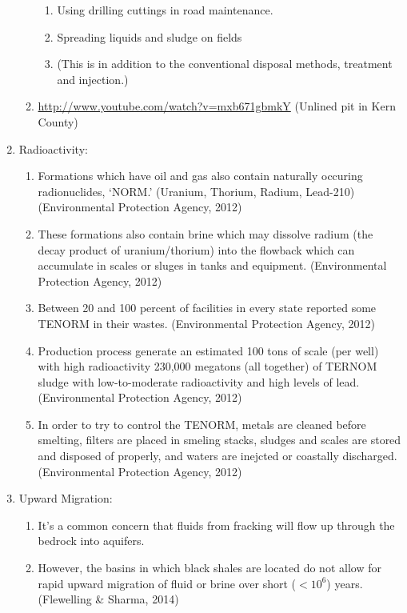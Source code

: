 \documentclass{article}
\begin{document}
\begin{enumerate}
\begin{enumerate}
\begin{enumerate}
                \item Using drilling cuttings in road maintenance.
                \item Spreading liquids and sludge on fields
                \item (This is in addition to the conventional disposal methods, treatment and injection.)
            \end{enumerate}
          \item \url{http://www.youtube.com/watch?v=mxb671gbmkY} (Unlined pit in Kern County) 
        \end{enumerate}
      \item Radioactivity:
        \begin{enumerate}
          \item Formations which have oil and gas also contain naturally occuring radionuclides, `NORM.' (Uranium, Thorium, Radium, Lead-210) (Environmental Protection Agency, 2012)
          \item These formations also contain brine which may dissolve radium (the decay product of uranium/thorium) into the flowback which can accumulate in scales or sluges in tanks and equipment. (Environmental Protection Agency, 2012) 
          \item Between 20 and 100 percent of facilities in every state reported some TENORM in their wastes. (Environmental Protection Agency, 2012) 
          \item Production process generate an estimated 100 tons of scale (per well) with high radioactivity 230,000 megatons (all together) of TERNOM sludge with low-to-moderate radioactivity and high levels of lead. (Environmental Protection Agency, 2012) 
          \item In order to try to control the TENORM, metals are cleaned before smelting, filters are placed in smeling stacks, sludges and scales are stored and disposed of properly, and waters are inejcted or coastally discharged. (Environmental Protection Agency, 2012) 
        \end{enumerate}
      \item Upward Migration:
        \begin{enumerate}
          \item It's a common concern that fluids from fracking will flow up through the bedrock into aquifers.
          \item However, the basins in which black shales are located do not allow for rapid upward migration of fluid or brine over short ($< 10^6$) years. (Flewelling \& Sharma, 2014)

\end{enumerate}
\end{enumerate}
\end{document}
